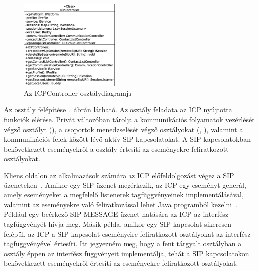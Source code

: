 \begin{figure}
  \vspace{-60pt}
  \begin{center}
    \includegraphics[width=0.43\textwidth]{img/class_diagrams/client/eps/ICPController.eps}
  \end{center}
  \vspace{-10pt}
  \captionsetup{font=scriptsize}
  \caption{Az ICPController osztálydiagramja}
   \label{fig:client_icpcontroller}
  \vspace{-18pt}
\end{figure}

Az  osztály felépítése .~ábrán látható. Az osztály feladata az ICP nyújtotta funkciók elérése. Privát változóban tárolja a kommunikációs folyamatok vezérlését végző osztályt (), a csoportok menedzselését végző osztályokat (, ), valamint a kommunikációs felek között lévő aktív SIP kapcsolatokat. A SIP kapcsolatokban bekövetkezett eseményekről a  osztály értesíti az eseményekre feliratkozott osztályokat.

\begin{mycomment}
Kliens oldalon az alkalmazások számára az ICP előfeldolgozást végez a SIP üzeneteken~\cite{sds_dev_guide}. Amikor egy SIP üzenet megérkezik, az ICP egy eseményt generál, amely eseményeket a megfelelő listenerek tagfüggvényeinek implementálásával, valamint az eseményekre való feliratkozással lehet Java programból kezelni~\cite{sds_client_flow}. Például egy beérkező SIP MESSAGE üzenet hatására az ICP az  interfész  tagfüggvényét hívja meg. Másik példa, amikor egy SIP kapcsolat sikeresen felépül, az ICP a SIP kapcsolat eseményeire feliratkozott osztályokat az  interfész  tagfüggvényével értesíti. Itt jegyezném meg, hogy a fent tárgyalt  osztályban a  osztály éppen az  interfész függvényeit implementálja, tehát a SIP kapcsolatokon bekövetkezett eseményekről értesíti az eseményekre feliratkozott osztályokat.
\end{mycomment}

